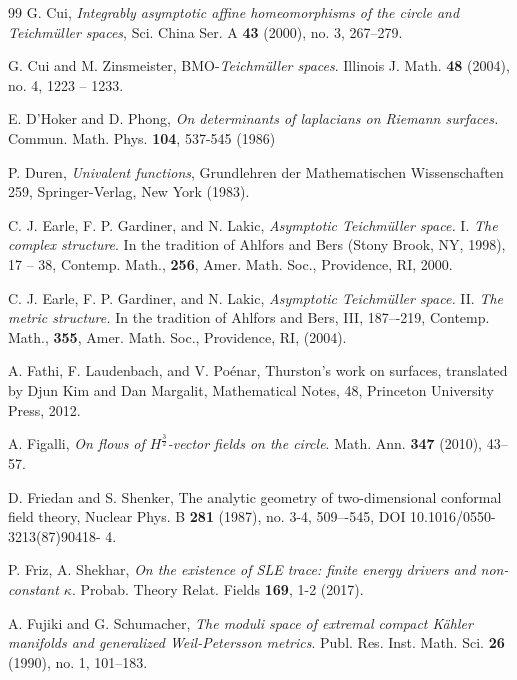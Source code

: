 \documentclass[12pt]{amsart}
\theoremstyle{plain}
\theoremstyle{definition}
\theoremstyle{remark}
\numberwithin{equation}{section} %
\numberwithin{figure}{section} %
\begin{document}
\begin{thebibliography}{99}
 G. Cui, \textit{Integrably asymptotic affine homeomorphisms of the circle and Teichm\"uller spaces}, Sci. China Ser. A {\bf 43} (2000), no. 3, 267--279.

 G. Cui and M. Zinsmeister, BMO-{\it Teichm\"uller spaces}.
Illinois J. Math. {\bf 48} (2004), no. 4, 1223 -- 1233.

 E. D'Hoker and D. Phong, \textit{On determinants of laplacians on Riemann surfaces.} Commun. Math.
Phys. {\bf 104}, 537-545 (1986)


 P. Duren,  \textit{Univalent functions}, Grundlehren der
  Mathematischen Wissenschaften 259,  Springer-Verlag, New York (1983).

 C. J. Earle, F. P. Gardiner, and N. Lakic, {\it Asymptotic Teichmüller space.} I. {\it The complex structure}. In the tradition of Ahlfors and Bers (Stony Brook, NY, 1998), 17 -- 38, Contemp. Math., {\bf 256}, Amer. Math. Soc., Providence, RI, 2000.

 C. J. Earle, F. P. Gardiner, and N. Lakic, {\it Asymptotic Teichmüller space.} II. {\it The metric structure.} In the tradition of Ahlfors and Bers, III, 187–-219, Contemp. Math., {\bf 355}, Amer. Math. Soc., Providence, RI, (2004). 

 A. Fathi, F. Laudenbach, and V. Po\'enar, Thurston’s work on surfaces,  translated by Djun Kim and Dan Margalit, Mathematical Notes, 48, Princeton University Press, 2012.

 A. Figalli, \emph{On flows of $H^{\frac 32}$-vector fields on the circle}. Math. Ann. \textbf{347} (2010), 43--57.

 D. Friedan and S. Shenker, The analytic geometry of two-dimensional conformal
field theory, Nuclear Phys. B {\bf 281} (1987), no. 3-4, 509–-545, DOI 10.1016/0550-3213(87)90418-
4.

 P. Friz, A. Shekhar, \textit{On the existence of \emph{SLE} trace: finite energy drivers and non-constant \(\kappa\)}. Probab. Theory Relat. Fields {\bf 169}, 1-2 (2017).

 A. Fujiki and G. Schumacher, {\it The moduli space of extremal compact Kähler manifolds and generalized Weil-Petersson metrics}. Publ. Res. Inst. Math. Sci. {\bf 26} (1990), no. 1, 101–183.
 

\end{thebibliography}
\end{document}
